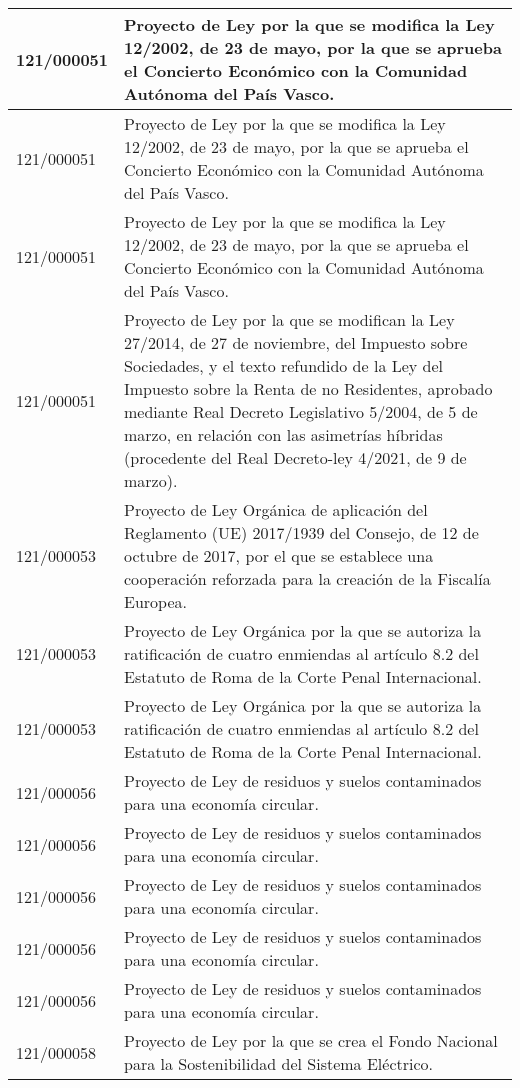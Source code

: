 {\begin{table}[H]
\begin{center}
\begin{tabularx}{\linewidth}{| l | X |}
\hline
121/000051 & Proyecto de Ley por la que se modifica la Ley 12/2002, de 23 de mayo, por la que se aprueba el Concierto Económico con la Comunidad Autónoma del País Vasco. \\
\hline
121/000051 & Proyecto de Ley por la que se modifica la Ley 12/2002, de 23 de mayo, por la que se aprueba el Concierto Económico con la Comunidad Autónoma del País Vasco. \\
\hline
121/000051 & Proyecto de Ley por la que se modifica la Ley 12/2002, de 23 de mayo, por la que se aprueba el Concierto Económico con la Comunidad Autónoma del País Vasco. \\
\hline
121/000051 & Proyecto de Ley por la que se modifican la Ley 27/2014, de 27 de noviembre, del Impuesto sobre Sociedades, y el texto refundido de la Ley del Impuesto sobre la Renta de no Residentes, aprobado mediante Real Decreto Legislativo 5/2004, de 5 de marzo, en relación con las asimetrías híbridas (procedente del Real Decreto-ley 4/2021, de 9 de marzo). \\
\hline
121/000053 & Proyecto de Ley Orgánica de aplicación del Reglamento (UE) 2017/1939 del Consejo, de 12 de octubre de 2017, por el que se establece una cooperación reforzada para la creación de la Fiscalía Europea. \\
\hline
121/000053 & Proyecto de Ley Orgánica por la que se autoriza la ratificación de cuatro enmiendas al artículo 8.2 del Estatuto de Roma de la Corte Penal Internacional. \\
\hline
121/000053 & Proyecto de Ley Orgánica por la que se autoriza la ratificación de cuatro enmiendas al artículo 8.2 del Estatuto de Roma de la Corte Penal Internacional. \\
\hline
121/000056 & Proyecto de Ley de residuos y suelos contaminados para una economía circular. \\
\hline
121/000056 & Proyecto de Ley de residuos y suelos contaminados para una economía circular. \\
\hline
121/000056 & Proyecto de Ley de residuos y suelos contaminados para una economía circular. \\
\hline
121/000056 & Proyecto de Ley de residuos y suelos contaminados para una economía circular. \\
\hline
121/000056 & Proyecto de Ley de residuos y suelos contaminados para una economía circular. \\
\hline
121/000058 & Proyecto de Ley por la que se crea el Fondo Nacional para la Sostenibilidad del Sistema Eléctrico. \\

\end{tabularx}
\end{center}
\end{table}}
